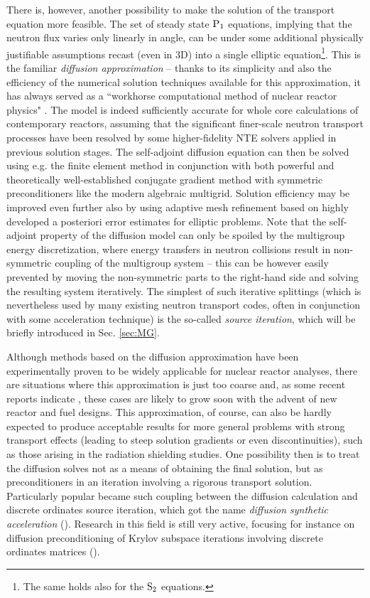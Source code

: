 There is, however, another possibility to make the solution of the transport equation more feasible. The set of
steady state $\PN[1]$ equations, implying that the neutron flux varies only linearly in angle, can be under some
additional physically justifiable assumptions recast (even in 3D) into a single elliptic equation\footnote{The same
holds also for the $\SN[2]$ equations.}. This is the familiar \textit{diffusion approximation} -- thanks to its simplicity and also the
efficiency of the numerical solution techniques available for this approximation, it has always served as a ``workhorse
computational method of nuclear reactor physics" \cite[p. 43]{Stacey1}. The model is indeed sufficiently accurate for
whole core calculations of contemporary reactors, assuming that the significant finer-scale neutron transport processes
have been resolved by some higher-fidelity NTE solvers applied in previous solution stages. The self-adjoint diffusion
equation can then be solved using e.g. the finite element method in conjunction with both powerful and theoretically
well-established conjugate gradient method with symmetric preconditioners like the modern algebraic multigrid. Solution
efficiency may be improved even further also by using adaptive mesh refinement based on highly developed a posteriori
error estimates for elliptic problems. Note that the self-adjoint property of the diffusion model can only be spoiled by
the multigroup energy discretization, where energy transfers in neutron collisions result in non-symmetric coupling of
the multigroup system -- this can be however easily prevented by moving the non-symmetric parts to the right-hand side
and solving the resulting system iteratively. The simplest of such iterative splittings (which is nevertheless used by
many existing neutron transport codes, often in conjunction with some acceleration technique) is the so-called
\textit{source iteration}, which will be briefly introduced in Sec. \ref{sec:MG}.

Although methods based on the diffusion approximation have been experimentally proven to be widely applicable for
nuclear reactor analyses, there are situations where this approximation is just too coarse and, as some recent reports
indicate \cite{Hejzlar1,Cho1}, these cases are likely to grow soon with the advent of new reactor and fuel designs. This
approximation, of course, can also be hardly expected to produce acceptable results for more general problems with
strong transport effects (leading to steep solution gradients or even discontinuities), such as those arising in the
radiation shielding studies. One possibility then is to treat the diffusion solves not as a means of obtaining the final
solution, but as preconditioners in an iteration involving a rigorous transport solution. Particularly popular became
such coupling between the diffusion calculation and discrete ordinates source iteration, which got the name
\textit{diffusion synthetic acceleration} (\cite{Alcouffe1}). Research in this field is still very active, focusing for
instance on diffusion preconditioning of Krylov subspace iterations involving discrete ordinates matrices (\cite[Chap.
1]{Azmy1}).


